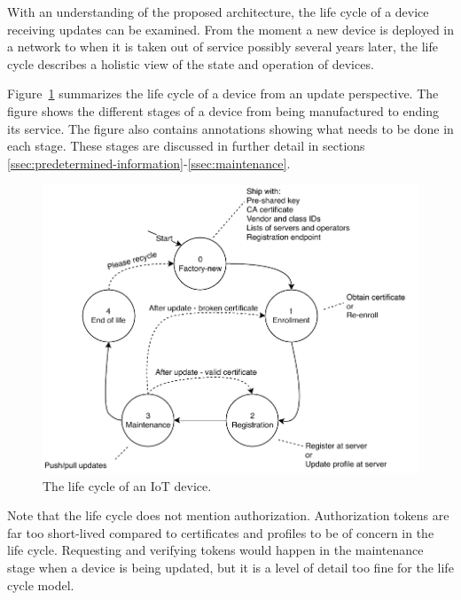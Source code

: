 \documentclass[0-thesis.tex]{subfiles}
\begin{document}
With an understanding of the proposed architecture, the life cycle of a device receiving
updates can be examined. From the moment a new device is deployed in a network to when it
is taken out of service possibly several years later, the life cycle describes a holistic
view of the state and operation of devices.

Figure~\ref{fig:lifecycle} summarizes the life cycle of a device from an update
perspective. The figure shows the different stages of a device from being manufactured to
ending its service. The figure also contains annotations showing what needs to be done in
each stage. These stages are discussed in further detail in sections
\ref{ssec:predetermined-information}-\ref{ssec:maintenance}. 

\begin{figure}[t]
    \caption{The life cycle of an IoT device.}
    \label{fig:lifecycle}
    \includegraphics{images/lifecycle.pdf}
\end{figure}

Note that the life cycle does not mention authorization. Authorization tokens are far too
short-lived compared to certificates and profiles to be of concern in the life cycle.
Requesting and verifying tokens would happen in the maintenance stage when a device is
being updated, but it is a level of detail too fine for the life cycle model.
\end{document}
